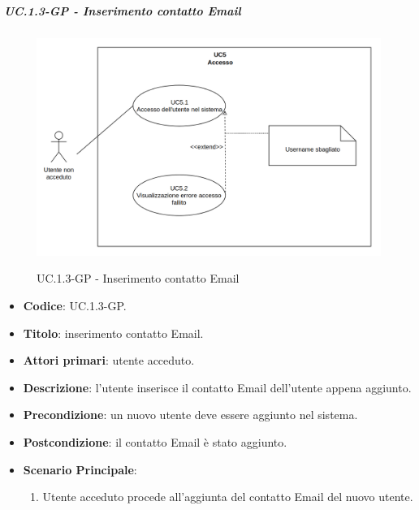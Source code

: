 				\subparagraph{UC\theuccount.1.3-GP - Inserimento contatto Email}
					\begin{figure}[H]
						\centering
						\includegraphics[width=\columnwidth]{img/UC5.png}\\
						\caption{UC\theuccount.1.3-GP - Inserimento contatto Email}
					\end{figure}
					\begin{itemize}
						\item \textbf{Codice}: UC\theuccount.1.3-GP.
						\item \textbf{Titolo}: inserimento contatto Email.
						\item \textbf{Attori primari}: utente acceduto.
						\item \textbf{Descrizione}: l'utente inserisce il contatto Email dell'utente appena aggiunto.
						\item \textbf{Precondizione}: un nuovo utente deve essere aggiunto nel sistema.
						\item \textbf{Postcondizione}: il contatto Email è stato aggiunto.
						\item \textbf{Scenario Principale}:
						\begin{enumerate}
							\item Utente acceduto procede all'aggiunta del contatto Email del nuovo utente.
						\end{enumerate}
				\end{itemize}

